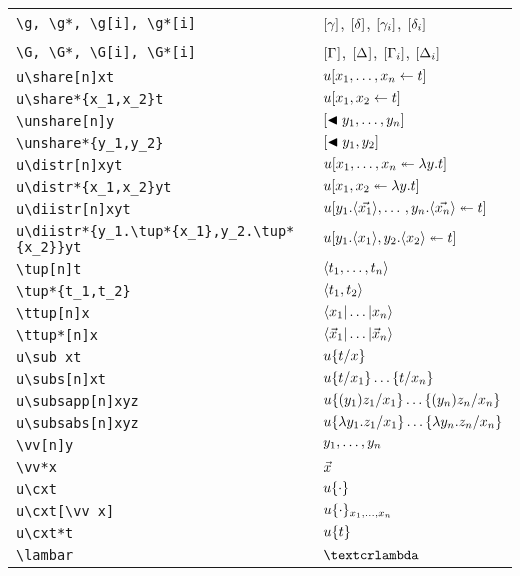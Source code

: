 \documentclass{article}
\begin{document}
\centering


\begin{tabular}{l@{\qquad\qquad}l}
	\verb|\g, \g*, \g[i], \g*[i]|	& $\g$, $\g*$, $\g[i]$, $\g*[i]$	\\[5pt]
	\verb|\G, \G*, \G[i], \G*[i]|	& $\G$, $\G*$, $\G[i]$, $\G*[i]$	\\[5pt]
	\verb|u\share[n]xt| 				& $u\share[n]xt$					\\[5pt]
    \verb|u\share*{x_1,x_2}t|		& $u\share*{x_1,x_2}t$			\\[5pt]
	\verb|\unshare[n]y| 				& $\unshare[n]y$					\\[5pt]
    \verb|\unshare*{y_1,y_2}|		& $\unshare*{y_1,y_2}$			\\[5pt]
	\verb|u\distr[n]xyt| 			& $u\distr[n]xyt$				\\[5pt]
    \verb|u\distr*{x_1,x_2}yt|		& $u\distr*{x_1,x_2}yt$			\\[5pt]
	\verb|u\diistr[n]xyt| 			& $u\diistr[n]xyt$				\\[5pt]
        \verb|u\diistr*{y_1.\tup*{x_1},y_2.\tup*{x_2}}yt| &   $u\diistr*{y_1.\tup*{x_1},y_2.\tup*{x_2}}yt$		\\[5pt]
	\verb|\tup[n]t|					& $\tup[n]t$						\\[5pt]
	\verb|\tup*{t_1,t_2}|			& $\tup*{t_1,t_2}$				\\[5pt]
	\verb|\ttup[n]x|					& $\ttup[n]x$					\\[5pt]
	\verb|\ttup*[n]x|				& $\ttup*[n]x$					\\[5pt]
    \verb|u\sub xt|					& $u\sub xt$						\\[5pt]
    \verb|u\subs[n]xt|				& $u\subs[n]xt$					\\[5pt]
    \verb|u\subsapp[n]xyz|			& $u\subsapp[n]xyz$				\\[5pt]
    \verb|u\subsabs[n]xyz|			& $u\subsabs[n]xyz$				\\[5pt]
	\verb|\vv[n]y|					& $\vv[n]y$						\\[5pt]
	\verb|\vv*x|						& $\vv*x$						\\[5pt]
    \verb|u\cxt|						& $u\cxt$						\\[5pt]
    \verb|u\cxt[\vv x]|				& $u\cxt[\vv x]$					\\[5pt]
    \verb|u\cxt*t|					& $u\cxt*t$						\\[5pt]
    \verb|\lambar|					& $\lambar$
\end{tabular}
\end{document}
